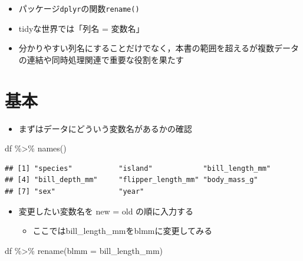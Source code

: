 \documentclass[
  xelatex,ja=standard, b5paper]{bxjsbook}
\newenvironment{Shaded}{\begin{snugshade}}{\end{snugshade}}
\newcommand{\AttributeTok}[1]{\textcolor[rgb]{0.77,0.63,0.00}{#1}}
\newcommand{\FunctionTok}[1]{\textcolor[rgb]{0.00,0.00,0.00}{#1}}
\newcommand{\NormalTok}[1]{#1}
\newcommand{\SpecialCharTok}[1]{\textcolor[rgb]{0.00,0.00,0.00}{#1}}
\providecommand{\tightlist}{%
  \setlength{\itemsep}{0pt}\setlength{\parskip}{0pt}}
\begin{document}
\begin{itemize}
\tightlist
\item
  パッケージ\texttt{dplyr}の関数\texttt{rename()}
\item
  tidyな世界では「列名 = 変数名」
\item
  分かりやすい列名にすることだけでなく，本書の範囲を超えるが複数データの連結や同時処理関連で重要な役割を果たす
\end{itemize}

\hypertarget{rename-standard}{%
\section{基本}\label{rename-standard}}

\begin{itemize}
\tightlist
\item
  まずはデータにどういう変数名があるかの確認
\end{itemize}

\begin{Shaded}
\begin{Highlighting}[]
\NormalTok{df }\SpecialCharTok{\%\textgreater{}\%} \FunctionTok{names}\NormalTok{()}
\end{Highlighting}
\end{Shaded}

\begin{verbatim}
## [1] "species"           "island"            "bill_length_mm"   
## [4] "bill_depth_mm"     "flipper_length_mm" "body_mass_g"      
## [7] "sex"               "year"
\end{verbatim}

\begin{itemize}
\tightlist
\item
  変更したい変数名を new = old の順に入力する

  \begin{itemize}
  \tightlist
  \item
    ここではbill\_length\_mmをblmmに変更してみる
  \end{itemize}
\end{itemize}

\begin{Shaded}
\begin{Highlighting}[]
\NormalTok{df }\SpecialCharTok{\%\textgreater{}\%} 
  \FunctionTok{rename}\NormalTok{(}\AttributeTok{blmm =}\NormalTok{ bill\_length\_mm)}
\end{Highlighting}
\end{Shaded}
\end{document}
